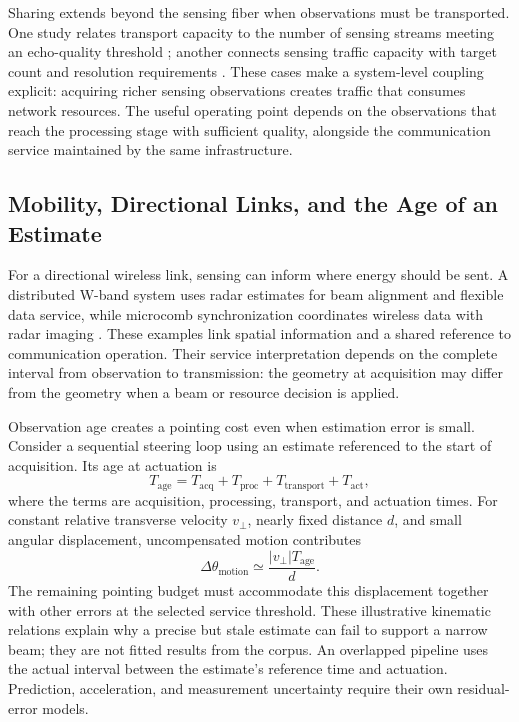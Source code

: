 Sharing extends beyond the sensing fiber when observations must be transported.
One study relates transport capacity to the number of sensing streams meeting
an echo-quality threshold \cite{OISAC_SCR00436}; another connects sensing traffic
capacity with target count and resolution requirements \cite{OISAC_SCR01049}.
These cases make a system-level coupling explicit: acquiring richer sensing
observations creates traffic that consumes network resources. The useful
operating point depends on the observations that reach the processing stage
with sufficient quality, alongside the communication service maintained by the
same infrastructure.

\subsection{Mobility, Directional Links, and the Age of an Estimate}

For a directional wireless link, sensing can inform where energy should be
sent. A distributed W-band system uses radar estimates for beam alignment and
flexible data service, while microcomb synchronization coordinates wireless
data with radar imaging \cite{OISAC_SCR00502,OISAC_SCR00406}. These examples link
spatial information and a shared reference to communication operation. Their
service interpretation depends on the complete interval from observation to
transmission: the geometry at acquisition may differ from the geometry when a
beam or resource decision is applied.

Observation age creates a pointing cost even when estimation error is small.
Consider a sequential steering loop using an estimate referenced to the start
of acquisition. Its age at actuation is
\begin{equation}
T_{\mathrm{age}}=T_{\mathrm{acq}}+T_{\mathrm{proc}}
+T_{\mathrm{transport}}+T_{\mathrm{act}},
\label{eq:observation_age}
\end{equation}
where the terms are acquisition, processing, transport, and actuation times.
For constant relative transverse velocity $v_\perp$, nearly fixed distance $d$,
and small angular displacement, uncompensated motion contributes
\begin{equation}
\Delta\theta_{\mathrm{motion}}\simeq
\frac{|v_\perp|T_{\mathrm{age}}}{d}.
\label{eq:motion_pointing}
\end{equation}
The remaining pointing budget must accommodate this displacement together
with other errors at the selected service threshold. These illustrative
kinematic relations explain why a precise but stale estimate can fail to
support a narrow beam; they are not fitted results from the corpus.
An overlapped pipeline uses the actual interval between the estimate's
reference time and actuation. Prediction, acceleration, and measurement
uncertainty require their own residual-error models.

